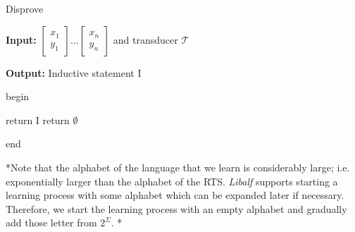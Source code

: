 \begin{algorithm}
    \caption{Disprove}\label{algorihtm:disprove}
    \textbf{Input: } $\left[\substack{x_1 \\ y_1}\right] \dots \left[\substack{x_n \\ y_n}\right]$ and transducer $\mathcal{T}$

    \textbf{Output: } Inductive statement I
    
    begin
    \begin{algorithmic}[1]
        \EndFor
                \EndFor
            \Else
                \State return I
            \EndIf
        \EndWhile
        \State return $\emptyset$
    \end{algorithmic}
    end
\end{algorithm}

*Note that the alphabet of the language that we learn is
considerably large; i.e. exponentially larger than the alphabet
of the RTS. \textit{Libalf} supports starting a learning process
with some alphabet which can be expanded later if necessary.
Therefore, we start the learning process with an empty alphabet 
and gradually add those letter from  $2^\Sigma$. *
